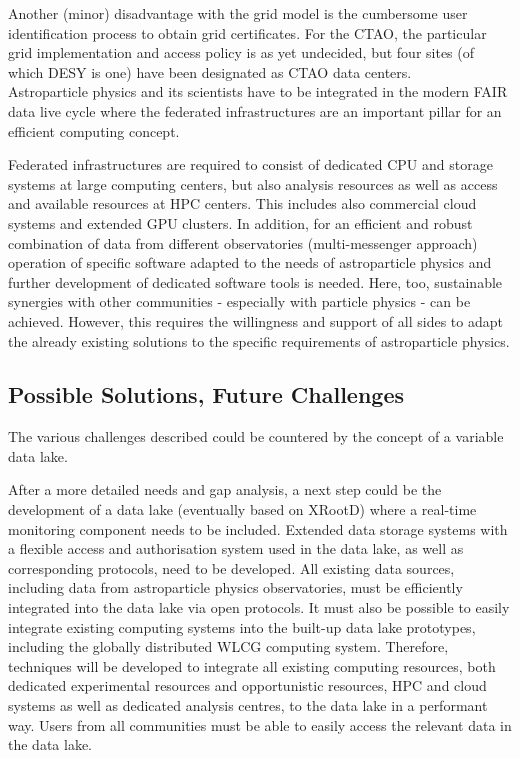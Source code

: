 Another (minor) disadvantage with the grid model is the cumbersome user
identification process to obtain grid certificates. For the CTAO, the
particular grid implementation and access policy is as yet undecided, but
four sites (of which DESY is one) have been designated as CTAO data
centers. \\

Astroparticle physics and its scientists have to be integrated in the modern FAIR data live cycle where the federated infrastructures are an important pillar for an efficient computing concept.

Federated infrastructures are required to consist of dedicated CPU
and storage systems at large computing centers, but also analysis
resources as well as access and  available
resources at HPC centers.
This includes also commercial cloud systems and extended GPU clusters.
In addition, for an efficient and robust combination of data from different observatories (multi-messenger approach) operation
of specific software adapted to the needs of astroparticle physics and further development of dedicated software tools is needed.
Here, too, sustainable synergies with other communities - especially with particle physics - can be achieved. However, this requires the willingness  and support of all sides to adapt the already existing solutions to the specific requirements of astroparticle physics. 



\subsection{Possible Solutions, Future Challenges}

The various challenges described could be countered by the concept of a variable data lake. 

After a more detailed needs and gap analysis, a next step could be the
development of a data lake (eventually based on XRootD) where a real-time monitoring component needs to be included. 
Extended data storage systems with a flexible access and authorisation system used in the data lake, as well as corresponding protocols, need to be developed. 
All existing data sources, including data from astroparticle physics observatories, must be efficiently integrated into the data lake via open protocols. It must also be possible to easily integrate existing computing systems into the built-up data lake prototypes, including the globally distributed WLCG computing system. 
Therefore, techniques will be developed to integrate all existing computing resources, both dedicated experimental resources and opportunistic resources, HPC and cloud systems as well as dedicated analysis centres, to the data lake in a performant way. 
Users from all communities must be able to easily access the relevant data in the data lake. \\

